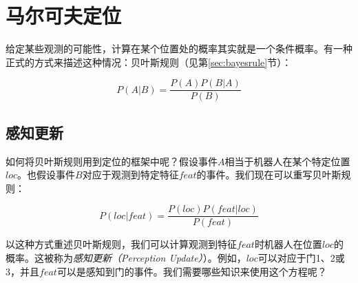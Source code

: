 
\section{马尔可夫定位}\label{sec：markovloc}
 给定某些观测的可能性，计算在某个位置处的概率其实就是一个条件概率。有一种正式的方式来描述这种情况：贝叶斯规则（见第\ref{sec:bayesrule}节）：

\begin{equation}
P(A|B)=\frac{P(A)P(B|A)}{P(B)}
\end{equation}


\subsection{感知更新}
如何将贝叶斯规则用到定位的框架中呢？假设事件$A$相当于机器人在某个特定位置$loc$。也假设事件$B$对应于观测到特定特征$feat$的事件。我们现在可以重写贝叶斯规则：


\begin{equation}
P(loc|feat)=\frac{P(loc)P(feat|loc)}{P(feat)}
\end{equation}


以这种方式重述贝叶斯规则，我们可以计算观测到特征$feat$时机器人在位置$loc$的概率。这被称为\emph{感知更新（Perception Update）}）。例如，$loc$可以对应于门1、2或3，并且$feat$可以是感知到门的事件。我们需要哪些知识来使用这个方程呢？

